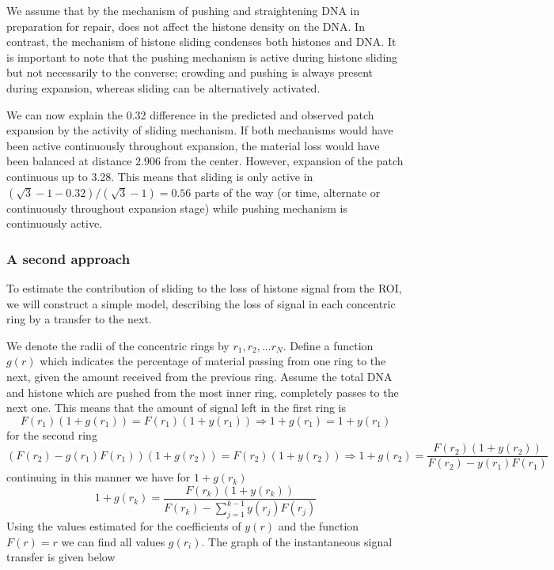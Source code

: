 \documentclass[12pt]{report}
\begin{document}
We assume that by the mechanism of pushing and straightening DNA in preparation for repair, does not affect the histone density on the DNA. In contrast, the mechanism of histone sliding condenses both histones and DNA. It is important to note that the pushing mechanism is active during histone sliding but not necessarily to the converse; crowding and pushing is always present during expansion, whereas sliding can be alternatively activated. 

We can now explain the 0.32 difference in the predicted and observed patch expansion by the activity of sliding mechanism. 
If both mechanisms would have been active continuously throughout expansion, the material loss would have been balanced at distance $2.906$ from the center. However, expansion of the patch continuous up to 3.28. This means that sliding is only active in $(\sqrt{3}-1-0.32)/(\sqrt{3}-1) =0.56$  parts of the way (or time, alternate or continuously throughout expansion stage) while pushing mechanism is continuously active.

\subsubsection{A second approach}
To estimate the contribution of sliding to the loss of histone signal from the ROI, we will construct a simple model, describing the loss of signal in each concentric ring by a transfer to the next. 

We denote the radii of the concentric rings by $r_1,r_2,...r_N$. Define a function $g(r)$ which indicates the percentage of material passing from one ring to the next, given the amount received from the previous ring. Assume the total DNA and histone which are pushed from the most inner ring, completely passes to the next one. This means that the amount of signal left in the first ring is
\begin{equation*}
F(r_1)(1+g(r_1)) = F(r_1)(1+y(r_1)) \Rightarrow 1+g(r_1)=1+y(r_1)
\end{equation*}
for the second ring 
\begin{equation*}
(F(r_2)-g(r_1)F(r_1))(1+g(r_2))= F(r_2)(1+y(r_2))\Rightarrow 1+g(r_2)=\frac{F(r_2)(1+y(r_2))}{F(r_2)-y(r_1)F(r_1)} 
\end{equation*}
continuing in this manner we have for $1+g(r_k)$
\begin{equation*}
1+g(r_k) =\frac{F(r_k)(1+y(r_k))}{F(r_k)-\sum_{j=1}^{k-1}y(r_j)F(r_j)} 
\end{equation*} 
Using the values estimated for the coefficients of $y(r)$ and the function $F(r)=r$  we can find all values $g(r_i)$. 
The graph of the instantaneous signal transfer is given below  
\end{document}
